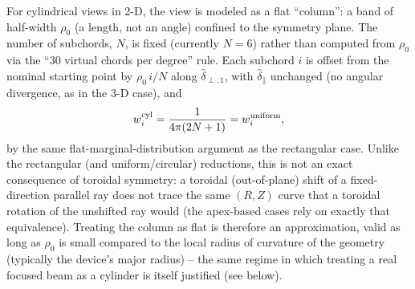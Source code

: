 \documentclass[12pt]{report}
\begin{document}

For cylindrical views in 2-D, the view is modeled as a flat ``column'': a
band of half-width $\rho_0$ (a length, not an angle) confined to the
symmetry plane. The number of subchords, $N$, is fixed (currently $N=6$) rather than computed from
$\rho_0$ via the ``30 virtual chords per degree'' rule. Each subchord $i$ is offset from the nominal starting
point by $\rho_0 \, i/N$ along $\hat{\delta}_{\perp,1}$, with
$\hat{\delta}_{\parallel}$ unchanged (no angular divergence, as in the
3-D case), and
\begin{equation}
w_{i}^{\rm cyl} = \frac{1}{4 \pi (2N + 1)} = w_{i}^{\rm uniform},
\end{equation}
by the same flat-marginal-distribution argument as the rectangular case.
Unlike the rectangular (and uniform/circular) reductions, this is not an
exact consequence of toroidal symmetry: a toroidal (out-of-plane) shift
of a fixed-direction parallel ray does not trace the same $(R,Z)$ curve
that a toroidal rotation of the unshifted ray would (the apex-based
cases rely on exactly that equivalence). Treating the column as flat is
therefore an approximation, valid as long as $\rho_0$ is small compared
to the local radius of curvature of the geometry (typically the device's
major radius) -- the same regime in which treating a real focused beam
as a cylinder is itself justified (see below).
\end{document}
